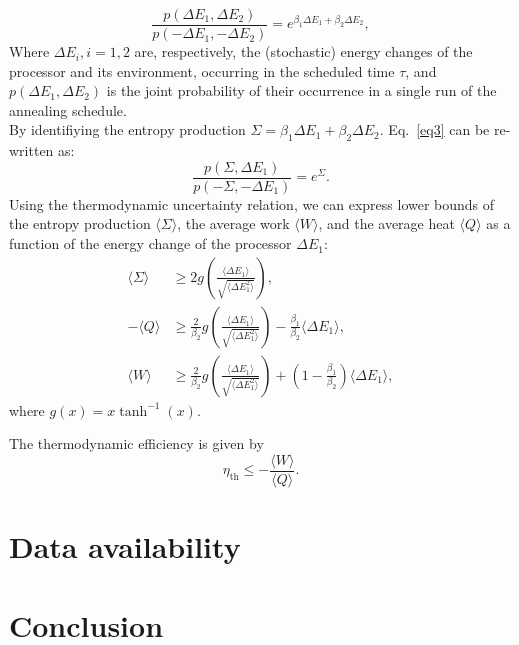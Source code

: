 \documentclass[default,iicol]{sn-jnl}%
\theoremstyle{thmstyleone}%
\theoremstyle{thmstyletwo}%
\theoremstyle{thmstylethree}%
\begin{document}
\begin{equation}
    \frac{p(\Delta E_1,\Delta E_2)}{p(-\Delta E_1,-\Delta E_2)}=e^{\beta_1 \Delta E_1 + \beta_2 \Delta E_2},
    \label{eq3}
\end{equation}
Where $\Delta E_i, i=1,2$ are, respectively, the (stochastic) energy changes of the processor and its environment, occurring in the scheduled time $\tau$, and $p(\Delta E_1,\Delta E_2)$ is the joint probability of their occurrence in a single run of the annealing schedule.\\
By identifiying the entropy production $\Sigma =\beta_1 \Delta E_1 + \beta_2 \Delta E_2$. Eq.~\eqref{eq3} can be re-written as:
\begin{equation}
    \frac{p(\Sigma,\Delta E_1)}{p(-\Sigma,-\Delta E_1)}=e^{\Sigma}. 
\end{equation}
Using the thermodynamic uncertainty relation, we can express lower bounds of the entropy production $\langle \Sigma \rangle$, the average work $\langle W\rangle$, and the average heat $\langle Q\rangle$ as a function of the energy change of the processor $\Delta E_1$:
\begin{align}
    \langle \Sigma \rangle &\geq  2g\left(\frac{\langle \Delta E_1 \rangle}{\sqrt{\langle \Delta E_1^2 \rangle}}\right),\\
    -\langle Q \rangle &\geq \frac{2}{\beta_2}g\left(\frac{\langle \Delta E_1 \rangle}{\sqrt{\langle \Delta E_1^2 \rangle}}\right) - \frac{\beta_1}{\beta_2} \langle \Delta E_1 \rangle,\\
    \langle W \rangle &\geq \frac{2}{\beta_2}g\left(\frac{\langle \Delta E_1 \rangle}{\sqrt{\langle \Delta E_1^2 \rangle}}\right) + \left( 1 - \frac{\beta_1}{\beta_2} \right) \langle \Delta E_1 \rangle,
\end{align}
where $g(x)=x\tanh^{-1}{(x)}$.

The thermodynamic efficiency is given by 
\begin{equation}
    \eta_{\text{th}} \leq - \frac{ \langle W \rangle}{ \langle Q \rangle}.
\end{equation}



\section{Data availability}\label{sec7}

\section{Conclusion}\label{sec13}
\end{document}
